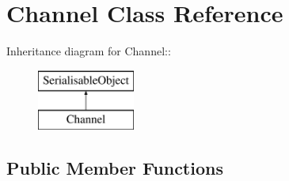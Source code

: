 \hypertarget{classChannel}{
\section{Channel Class Reference}
\label{classChannel}
}
Inheritance diagram for Channel::\begin{figure}[H]
\begin{center}
\leavevmode
\includegraphics[height=2cm]{classChannel}
\end{center}
\end{figure}
\subsection*{Public Member Functions}
